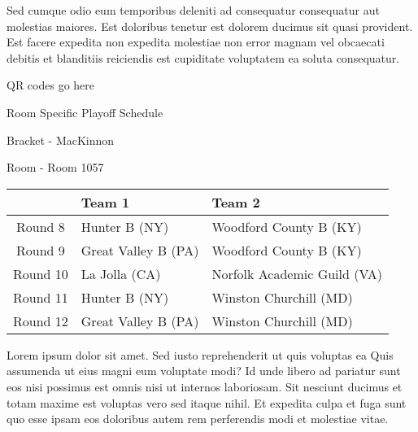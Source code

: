 \documentclass{article}%
\begin{document}
\newline%
Sed cumque odio eum temporibus deleniti ad consequatur consequatur aut molestias maiores. Est doloribus tenetur est dolorem ducimus sit quasi provident. Est facere expedita non expedita molestiae non error magnam vel obcaecati debitis et blanditiis reiciendis est cupiditate voluptatem ea soluta consequatur.%
\vspace*{140pt}%
\begin{center}%
\begin{Huge}%
QR codes go here%
\end{Huge}%
\end{center}%
\newpage%
\begin{center}%
\begin{Huge}%
Room Specific Playoff Schedule%
\end{Huge}%
\vspace*{8pt}%
\linebreak%
\begin{Large}%
Bracket {-} MacKinnon%
\end{Large}%
\vspace*{8pt}%
\linebreak%
\vspace*{8pt}%
\begin{Large}%
Room {-} Room 1057%
\end{Large}%
\end{center}%
%
\begin{tabularx}{\textwidth}{|c|Y|Y|}%
\hline%
&Team 1&Team 2\\%
\hline%
Round 8&Hunter B (NY)&Woodford County B (KY)\\%
Round 9&Great Valley B (PA)&Woodford County B (KY)\\%
Round 10&La Jolla (CA)&Norfolk Academic Guild (VA)\\%
Round 11&Hunter B (NY)&Winston Churchill (MD)\\%
Round 12&Great Valley B (PA)&Winston Churchill (MD)\\%
\hline%
\end{tabularx}%
\vspace*{8pt}%
\newline%
Lorem ipsum dolor sit amet. Sed iusto reprehenderit ut quis voluptas ea Quis assumenda ut eius magni eum voluptate modi? Id unde libero ad pariatur sunt eos nisi possimus est omnis nisi ut internos laboriosam. Sit nesciunt ducimus et totam maxime est voluptas vero sed itaque nihil. Et expedita culpa et fuga sunt quo esse ipsam eos doloribus autem rem perferendis modi et molestiae vitae.\newline%
\end{document}
